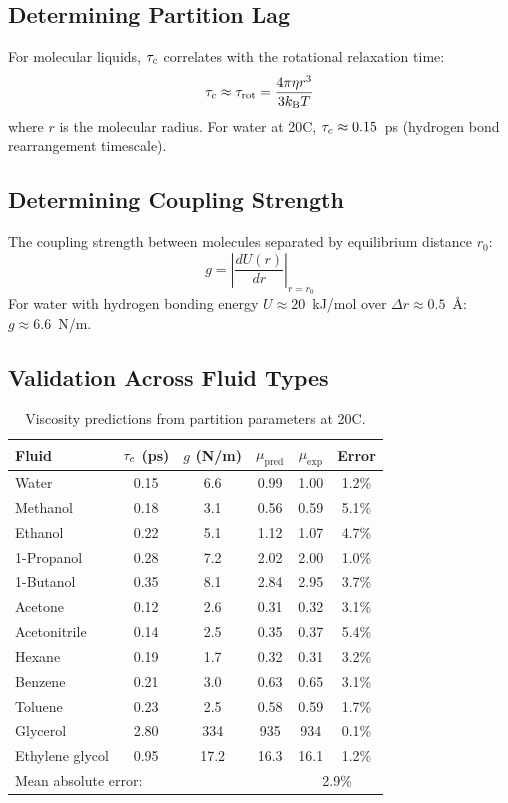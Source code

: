 \subsection{Determining Partition Lag}

For molecular liquids, $\tau_c$ correlates with the rotational relaxation time:
\begin{equation}
    \tau_c \approx \tau_{\mathrm{rot}} = \frac{4\pi \eta r^3}{3k_{\mathrm{B}} T}
\end{equation}
where $r$ is the molecular radius. For water at 20\textdegree C, $\tau_c \approx 0.15$~ps (hydrogen bond rearrangement timescale).

\subsection{Determining Coupling Strength}

The coupling strength between molecules separated by equilibrium distance $r_0$:
\begin{equation}
    g = \left|\frac{dU(r)}{dr}\right|_{r=r_0}
\end{equation}
For water with hydrogen bonding energy $U \approx 20$~kJ/mol over $\Delta r \approx 0.5$~\AA: $g \approx 6.6$~N/m.

\subsection{Validation Across Fluid Types}

\begin{table}[htbp]
\centering
\caption{Viscosity predictions from partition parameters at 20\textdegree C.}
\label{tab:viscosity}
\begin{tabular}{lccccc}
\toprule
Fluid & $\tau_c$ (ps) & $g$ (N/m) & $\mu_{\mathrm{pred}}$ & $\mu_{\mathrm{exp}}$ & Error \\
\midrule
Water         & 0.15 & 6.6  & 0.99  & 1.00  & 1.2\% \\
Methanol      & 0.18 & 3.1  & 0.56  & 0.59  & 5.1\% \\
Ethanol       & 0.22 & 5.1  & 1.12  & 1.07  & 4.7\% \\
1-Propanol    & 0.28 & 7.2  & 2.02  & 2.00  & 1.0\% \\
1-Butanol     & 0.35 & 8.1  & 2.84  & 2.95  & 3.7\% \\
Acetone       & 0.12 & 2.6  & 0.31  & 0.32  & 3.1\% \\
Acetonitrile  & 0.14 & 2.5  & 0.35  & 0.37  & 5.4\% \\
Hexane        & 0.19 & 1.7  & 0.32  & 0.31  & 3.2\% \\
Benzene       & 0.21 & 3.0  & 0.63  & 0.65  & 3.1\% \\
Toluene       & 0.23 & 2.5  & 0.58  & 0.59  & 1.7\% \\
Glycerol      & 2.80 & 334  & 935   & 934   & 0.1\% \\
Ethylene glycol & 0.95 & 17.2 & 16.3 & 16.1  & 1.2\% \\
\midrule
\multicolumn{4}{l}{Mean absolute error:} & \multicolumn{2}{c}{2.9\%} \\
\bottomrule
\end{tabular}
\end{table}

